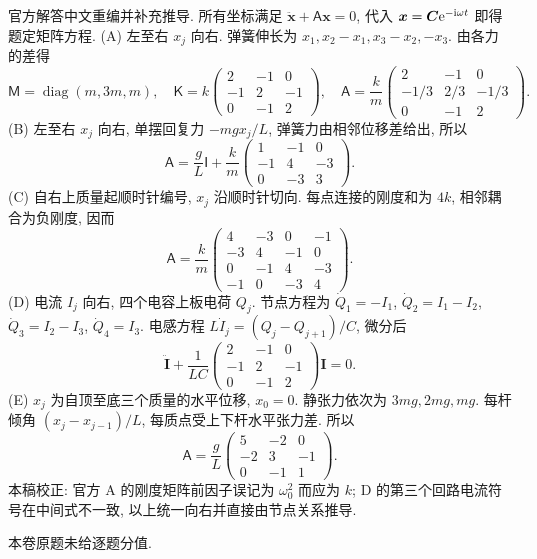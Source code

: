 \begin{solution}
官方解答中文重编并补充推导. 所有坐标满足 $\ddot{\boldsymbol x}+\mathsf A\boldsymbol x=0$, 代入 $\boldsymbol x=\boldsymbol C\mathrm e^{-\mathrm i\omega t}$ 即得题定矩阵方程.
(A) 左至右 $x_j$ 向右. 弹簧伸长为 $x_1,x_2-x_1,x_3-x_2,-x_3$. 由各力的差得
\[
\mathsf M=\operatorname{diag}(m,3m,m),\quad
\mathsf K=k\begin{pmatrix}2&-1&0\\-1&2&-1\\0&-1&2\end{pmatrix},\quad
\mathsf A=\frac{k}{m}\begin{pmatrix}2&-1&0\\-1/3&2/3&-1/3\\0&-1&2\end{pmatrix}.
\]
(B) 左至右 $x_j$ 向右, 单摆回复力 $-mgx_j/L$, 弹簧力由相邻位移差给出, 所以
\[
\mathsf A=\frac gL\mathsf I+\frac km\begin{pmatrix}1&-1&0\\-1&4&-3\\0&-3&3\end{pmatrix}.
\]
(C) 自右上质量起顺时针编号, $x_j$ 沿顺时针切向. 每点连接的刚度和为 $4k$, 相邻耦合为负刚度, 因而
\[
\mathsf A=\frac km\begin{pmatrix}4&-3&0&-1\\-3&4&-1&0\\0&-1&4&-3\\-1&0&-3&4\end{pmatrix}.
\]
(D) 电流 $I_j$ 向右, 四个电容上板电荷 $Q_j$. 节点方程为 $\dot Q_1=-I_1$, $\dot Q_2=I_1-I_2$, $\dot Q_3=I_2-I_3$, $\dot Q_4=I_3$. 电感方程 $L\dot I_j=(Q_j-Q_{j+1})/C$, 微分后
\[
\ddot{\boldsymbol I}+\frac1{LC}\begin{pmatrix}2&-1&0\\-1&2&-1\\0&-1&2\end{pmatrix}\boldsymbol I=0.
\]
(E) $x_j$ 为自顶至底三个质量的水平位移, $x_0=0$. 静张力依次为 $3mg,2mg,mg$. 每杆倾角 $(x_j-x_{j-1})/L$, 每质点受上下杆水平张力差. 所以
\[
\mathsf A=\frac gL\begin{pmatrix}5&-2&0\\-2&3&-1\\0&-1&1\end{pmatrix}.
\]
本稿校正: 官方 A 的刚度矩阵前因子误记为 $\omega_0^2$ 而应为 $k$; D 的第三个回路电流符号在中间式不一致, 以上统一向右并直接由节点关系推导.
\end{solution}
本卷原题未给逐题分值.
